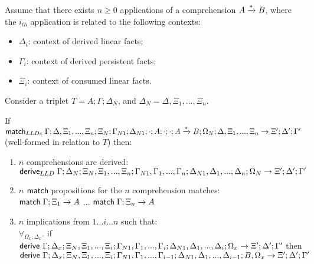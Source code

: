 \begin{lemma}[Comprehension]\label{thm:comprehension}
Assume that there exists $n \geq 0$ applications of a comprehension $A \xrightarrow{*} B$, where the $i_{th}$ application is related to the following contexts:
\begin{itemize}
   \item $\Delta_i$: context of derived linear facts;
   \item $\Gamma_i$: context of derived persistent facts;
   \item $\Xi_i$: context of consumed linear facts.
\end{itemize}
Consider a triplet $T = A; \Gamma; \Delta_{N}$, and $\Delta_N = \Delta, \Xi_1, ..., \Xi_n$.

If $\mathsf{match}_{LLDc} \; \Gamma; \Delta, \Xi_1, ..., \Xi_n; \Xi_N; \Gamma_{N1}; \Delta_{N1}; \cdot; A; \cdot; \cdot; A \xrightarrow{*} B; \Omega_N; \Delta, \Xi_1, ..., \Xi_n \rightarrow \Xi'; \Delta'; \Gamma'$ (well-formed in relation to $T$) then:

\begin{enumerate}
   \item $n$ comprehensions are derived:\\
   $\mathsf{derive}_{LLD} \; \Gamma; \Delta_N; \Xi_N, \Xi_1, ..., \Xi_n; \Gamma_{N1}, \Gamma_1, ..., \Gamma_n; \Delta_{N1}, \Delta_1, ..., \Delta_n; \Omega_N \rightarrow \Xi'; \Delta'; \Gamma'$
   \item $n$ $\mathsf{match} \;$propositions for the $n$ comprehension matches:\\
   $\mathsf{match} \; \Gamma; \Xi_1 \rightarrow A$ ... $\mathsf{match} \; \Gamma; \Xi_n \rightarrow A$
   \item $n$ implications from $1...i...n$ such that: \\
   $\forall_{\Omega_x, \Delta_x}.$ if $\mathsf{derive}~ \Gamma; \Delta_x; \Xi_N, \Xi_1, ..., \Xi_i; \Gamma_{N1}, \Gamma_1, ..., \Gamma_i; \Delta_{N1}, \Delta_1, ..., \Delta_i; \Omega_x \rightarrow \Xi'; \Delta'; \Gamma'$ then \linebreak $\mathsf{derive}~ \Gamma; \Delta_x; \Xi_N, \Xi_1, ..., \Xi_i; \Gamma_{N1}, \Gamma_1, ..., \Gamma_{i-1}; \Delta_{N1}, \Delta_1, ..., \Delta_{i-1}; B, \Omega_x \rightarrow \Xi'; \Delta'; \Gamma'$
\end{enumerate}
\end{lemma}


